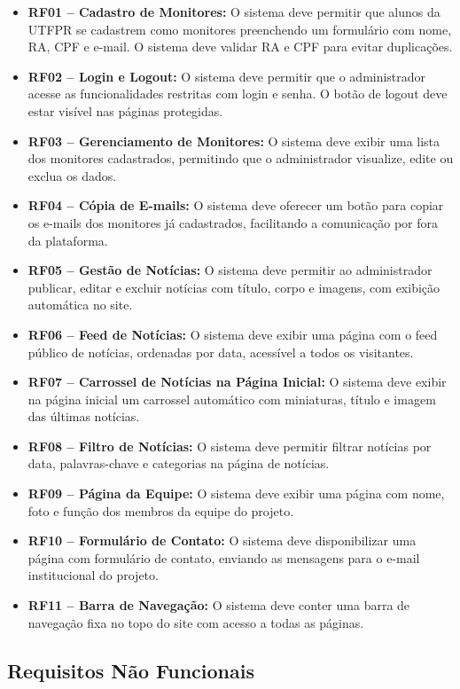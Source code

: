 \documentclass[a4paper,12pt]{article}
\begin{document}
\begin{itemize}
    \item \textbf{RF01 – Cadastro de Monitores:} O sistema deve permitir que alunos da UTFPR se cadastrem como monitores preenchendo um formulário com nome, RA, CPF e e-mail. O sistema deve validar RA e CPF para evitar duplicações.
    \item \textbf{RF02 – Login e Logout:} O sistema deve permitir que o administrador acesse as funcionalidades restritas com login e senha. O botão de logout deve estar visível nas páginas protegidas.
    \item \textbf{RF03 – Gerenciamento de Monitores:} O sistema deve exibir uma lista dos monitores cadastrados, permitindo que o administrador visualize, edite ou exclua os dados.
    \item \textbf{RF04 – Cópia de E-mails:} O sistema deve oferecer um botão para copiar os e-mails dos monitores já cadastrados, facilitando a comunicação por fora da plataforma.
    \item \textbf{RF05 – Gestão de Notícias:} O sistema deve permitir ao administrador publicar, editar e excluir notícias com título, corpo e imagens, com exibição automática no site.
    \item \textbf{RF06 – Feed de Notícias:} O sistema deve exibir uma página com o feed público de notícias, ordenadas por data, acessível a todos os visitantes.
    \item \textbf{RF07 – Carrossel de Notícias na Página Inicial:} O sistema deve exibir na página inicial um carrossel automático com miniaturas, título e imagem das últimas notícias.
    \item \textbf{RF08 – Filtro de Notícias:} O sistema deve permitir filtrar notícias por data, palavras-chave e categorias na página de notícias.
    \item \textbf{RF09 – Página da Equipe:} O sistema deve exibir uma página com nome, foto e função dos membros da equipe do projeto.
    \item \textbf{RF10 – Formulário de Contato:} O sistema deve disponibilizar uma página com formulário de contato, enviando as mensagens para o e-mail institucional do projeto.
    \item \textbf{RF11 – Barra de Navegação:} O sistema deve conter uma barra de navegação fixa no topo do site com acesso a todas as páginas.
\end{itemize}

\subsection{Requisitos Não Funcionais}
\end{document}
